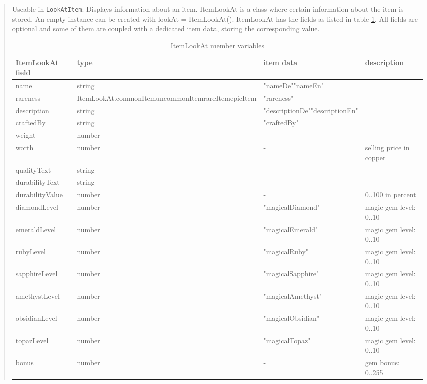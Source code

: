 \documentclass[a4paper,10pt,makeidx]{scrreprt}
\newcommand{\comm}[1]{\index{#1}\texttt{#1}}
\begin{document}
\begin{quote}
       Useable in \comm{LookAtItem}: Displays information about an item. ItemLookAt is a class where certain information about the item is stored. An empty instance can be created with lookAt = ItemLookAt(). ItemLookAt has the fields as listed in table \ref{ItemLookAt}. All fields are optional and some of them are coupled with a dedicated item data, storing the corresponding value.

\begin{table}
\begin{tabular}{l|p{3cm}|p{3cm}|p{3.5cm}}
    ItemLookAt field & type & item data & description\\ \hline
    name & string & "nameDe"\newline"nameEn"\\
    rareness & ItemLookAt.\newline\hspace*{5mm}commonItem\newline\hspace*{5mm}uncommonItem\newline\hspace*{5mm}rareItem\newline\hspace*{5mm}epicItem & "rareness"\\
    description & string & "descriptionDe"\newline"descriptionEn"\\
    craftedBy & string & "craftedBy"\\
    weight & number & -\\
    worth & number & - & selling price in copper\\
    qualityText & string & -\\
    durabilityText & string & -\\
    durabilityValue & number & - & 0..100 in percent\\
    diamondLevel & number & "magicalDiamond" & magic gem level: 0..10\\
    emeraldLevel & number & "magicalEmerald" & magic gem level: 0..10\\
    rubyLevel & number & "magicalRuby" & magic gem level: 0..10\\
    sapphireLevel & number & "magicalSapphire" & magic gem level: 0..10\\
    amethystLevel & number & "magicalAmethyst" & magic gem level: 0..10\\
    obsidianLevel & number & "magicalObsidian" & magic gem level: 0..10\\
    topazLevel & number & "magicalTopaz" & magic gem level: 0..10\\
    bonus & number & - & gem bonus: 0..255\\
\end{tabular}
\caption{ItemLookAt member variables}\label{ItemLookAt}
\end{table}

\end{quote}
\end{document}
